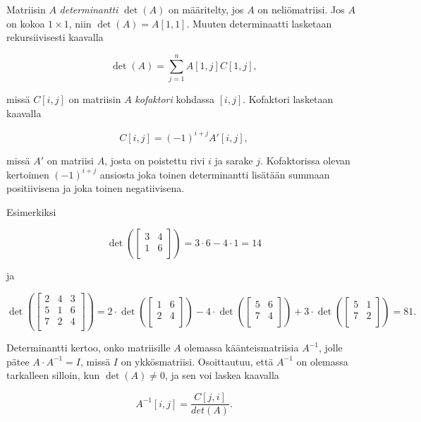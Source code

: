 
Matriisin $A$ \textit{determinantti} $\det(A)$
on määritelty, jos $A$ on neliömatriisi.
Jos $A$ on kokoa $1 \times 1$,
niin $\det(A)=A[1,1]$.
Muuten determinaatti lasketaan rekursiivisesti
kaavalla

\[\det(A)=\sum_{j=1}^n A[1,j] C[1,j],\]

missä $C[i,j]$ on matriisin $A$ \textit{kofaktori}
kohdassa $[i,j]$.
Kofaktori lasketaan kaavalla

\[C[i,j] = (-1)^{i+j} A'[i,j],\]

missä $A'$ on matriisi $A$, josta on poistettu
rivi $i$ ja sarake $j$.
Kofaktorissa olevan kertoimen $(-1)^{i+j}$ ansiosta
joka toinen determinantti
lisätään summaan positiivisena
ja joka toinen negatiivisena.

Esimerkiksi

\[
\det(
 \begin{bmatrix}
  3 & 4 \\
  1 & 6 \\
 \end{bmatrix}
) = 3 \cdot 6 - 4 \cdot 1 = 14 
\]

ja

\[
\det(
 \begin{bmatrix}
  2 & 4 & 3 \\
  5 & 1 & 6 \\
  7 & 2 & 4 \\
 \end{bmatrix}
) = 
2 \cdot
\det(
 \begin{bmatrix}
  1 & 6 \\
  2 & 4 \\
 \end{bmatrix}
)
-4 \cdot
\det(
 \begin{bmatrix}
  5 & 6 \\
  7 & 4 \\
 \end{bmatrix}
)
+3 \cdot
\det(
 \begin{bmatrix}
  5 & 1 \\
  7 & 2 \\
 \end{bmatrix}
) = 81.
\]

Determinantti kertoo, onko matriisille
$A$ olemassa käänteismatriisia
$A^{-1}$, jolle pätee $A \cdot A^{-1} = I$,
missä $I$ on ykkösmatriisi.
Osoittautuu, että $A^{-1}$ on olemassa
tarkalleen silloin, kun $\det(A) \neq 0$,
ja sen voi laskea kaavalla

\[A^{-1}[i,j] = \frac{C[j,i]}{det(A)}.\]


